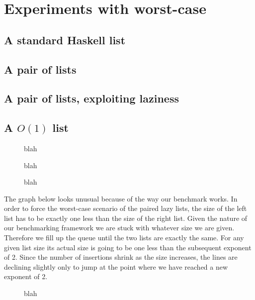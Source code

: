 \section*{Experiments with worst-case}

\subsection*{A standard Haskell list}
\subsection*{A pair of lists}
\subsection*{A pair of lists, exploiting laziness}
\subsection*{A $O(1)$ list}

\begin{figure}[htb]
\centering

\caption{blah}
\label{simple}
\end{figure}

\begin{figure}[htb]
\centering

\caption{blah}
\label{simple-high}
\end{figure}


\begin{figure}[htb]
\centering

\caption{blah}
\label{reuse-remove-2}
\end{figure}

The graph below looks unusual because of the way our benchmark works. In order to force the worst-case scenario of the paired lazy lists, the size of the left list has to be exactly one less than the size of the right list. Given the nature of our benchmarking framework we are stuck with whatever size we are given. Therefore we fill up the queue until the two lists are exactly the same. For any given list size its actual size is going to be one less than the subsequent exponent of 2. Since the number of insertions shrink as the size increases, the lines are declining slightly only to jump at the point where we have reached a new exponent of 2.


\begin{figure}[htb]
\centering

\caption{blah}
\label{reuse-remove-4}
\end{figure}


